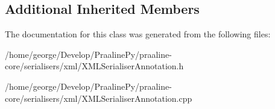 \subsection*{Additional Inherited Members}


The documentation for this class was generated from the following files\+:\begin{DoxyCompactItemize}
\item 
/home/george/\+Develop/\+Praaline\+Py/praaline-\/core/serialisers/xml/X\+M\+L\+Serialiser\+Annotation.\+h\item 
/home/george/\+Develop/\+Praaline\+Py/praaline-\/core/serialisers/xml/X\+M\+L\+Serialiser\+Annotation.\+cpp\end{DoxyCompactItemize}
